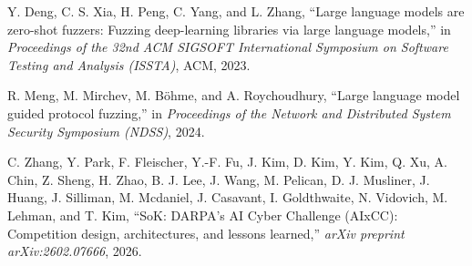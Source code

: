 Y. Deng, C. S. Xia, H. Peng, C. Yang, and L. Zhang, ``Large language models are zero-shot fuzzers: Fuzzing deep-learning libraries via large language models,'' in \textit{Proceedings of the 32nd ACM SIGSOFT International Symposium on Software Testing and Analysis (ISSTA)}, ACM, 2023.

R. Meng, M. Mirchev, M. B\"{o}hme, and A. Roychoudhury, ``Large language model guided protocol fuzzing,'' in \textit{Proceedings of the Network and Distributed System Security Symposium (NDSS)}, 2024.

C. Zhang, Y. Park, F. Fleischer, Y.-F. Fu, J. Kim, D. Kim, Y. Kim, Q. Xu, A. Chin, Z. Sheng, H. Zhao, B. J. Lee, J. Wang, M. Pelican, D. J. Musliner, J. Huang, J. Silliman, M. Mcdaniel, J. Casavant, I. Goldthwaite, N. Vidovich, M. Lehman, and T. Kim, ``SoK: DARPA's AI Cyber Challenge (AIxCC): Competition design, architectures, and lessons learned,'' \textit{arXiv preprint arXiv:2602.07666}, 2026.
